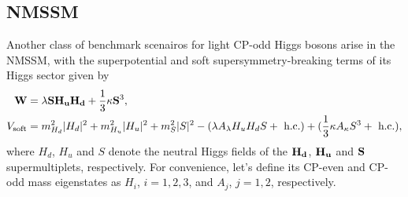 \documentclass[preprintnumbers,superscriptaddress,nofootinbib,aps,prd,floatfix]{revtex4}
\begin{document}
\subsection{NMSSM}

Another class of benchmark scenairos for light CP-odd Higgs bosons arise in the NMSSM, with the superpotential and soft
supersymmetry-breaking terms of its Higgs sector given by
\begin{align}
\mathbf{W} &= \lambda \mathbf{S} \mathbf{H_u} \mathbf{H_d} + \frac{1}{3}\kappa {\bf S}^3, 
\nonumber \\
V_{\text{soft}} &= {m^2_{H_d}} |H_d|^2 + {m^2_{H_u}} |H_u|^2 + {m^2_S}|S|^2 - (\lambda A_{\lambda} H_u H_d S + \text{ h.c.} ) +  (\frac{1}{3} \kappa A_{\kappa} S^3 + \text{ h.c.} ),
\label{eqn:PQlimit}
\end{align}
where $H_d$, $H_u$ and $S$ denote the neutral Higgs fields of the ${\bf H_d}$, ${\bf H_u}$ and ${\bf S}$ supermultiplets, respectively. For convenience, let's define its CP-even and CP-odd mass eigenstates as $H_i$, $i=1,2,3$, and $A_j$, $j=1,2$, respectively.
\end{document}
